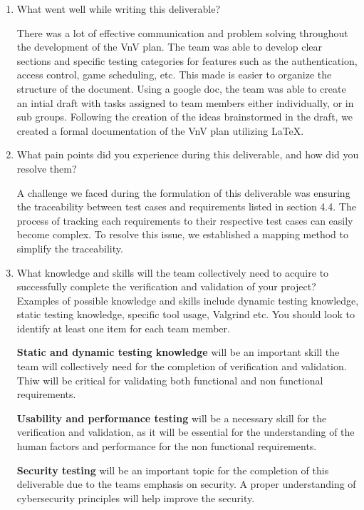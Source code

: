 \documentclass[12pt, titlepage]{article}
\begin{document}
\begin{enumerate}
	\item What went well while writing this deliverable?
	
	There was a lot of effective communication and problem solving throughout the
	development of the VnV plan. The team was able to develop clear sections and 
	specific testing categories for features such as the authentication, access
	control, game scheduling, etc. This made is easier to organize the structure
	of the document. Using a google doc, the team was able to create an intial 
	draft with tasks assigned to team members either individually, or in sub groups.
	Following the creation of the ideas brainstormed in the draft, we created a 
	formal documentation of the VnV plan utilizing LaTeX.
	
	\item What pain points did you experience during this deliverable, and how
		did you resolve them?
	
		A challenge we faced during the formulation of this deliverable was ensuring
		the traceability between test cases and requirements listed in section 4.4. 
		The process of tracking each requirements to their respective test cases can
		easily become complex. To resolve this issue, we established a mapping method
		to simplify the traceability.
	
	\item What knowledge and skills will the team collectively need to acquire to
	successfully complete the verification and validation of your project?
	Examples of possible knowledge and skills include dynamic testing knowledge,
	static testing knowledge, specific tool usage, Valgrind etc.  You should look to
	identify at least one item for each team member.
	
		\textbf{Static and dynamic testing knowledge} will be an important skill the
		team will collectively need for the completion of verification and validation.
		Thiw will be critical for validating both functional and non functional
		requirements.
	
		\textbf{Usability and performance testing} will be a necessary skill for the 
		verification and validation, as it will be essential for the understanding
		of the human factors and performance for the non functional requirements.
	
		\textbf{Security testing} will be an important topic for the completion of
		this deliverable due to the teams emphasis on security. A proper
		understanding of cybersecurity principles will help improve the security.


\end{enumerate}
\end{document}
